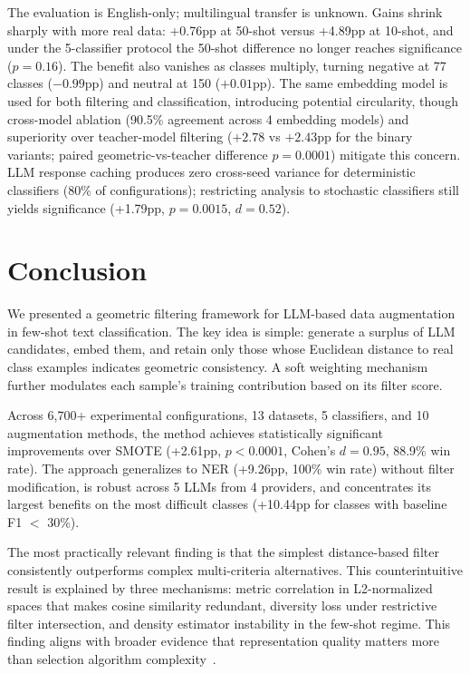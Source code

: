 \documentclass[conference]{IEEEtran}
\begin{document}
The evaluation is English-only; multilingual transfer is unknown. Gains shrink sharply with more real data: +0.76pp at 50-shot versus +4.89pp at 10-shot, and under the 5-classifier protocol the 50-shot difference no longer reaches significance ($p=0.16$). The benefit also vanishes as classes multiply, turning negative at 77 classes ($-0.99$pp) and neutral at 150 ($+0.01$pp). The same embedding model is used for both filtering and classification, introducing potential circularity, though cross-model ablation (90.5\% agreement across 4 embedding models) and superiority over teacher-model filtering ($+2.78$ vs $+2.43$pp for the binary variants; paired geometric-vs-teacher difference $p=0.0001$) mitigate this concern. LLM response caching produces zero cross-seed variance for deterministic classifiers (80\% of configurations); restricting analysis to stochastic classifiers still yields significance (+1.79pp, $p=0.0015$, $d=0.52$).

\section{Conclusion}

We presented a geometric filtering framework for LLM-based data augmentation in few-shot text classification. The key idea is simple: generate a surplus of LLM candidates, embed them, and retain only those whose Euclidean distance to real class examples indicates geometric consistency. A soft weighting mechanism further modulates each sample's training contribution based on its filter score.

Across 6,700+ experimental configurations, 13 datasets, 5 classifiers, and 10 augmentation methods, the method achieves statistically significant improvements over SMOTE (+2.61pp, $p<0.0001$, Cohen's $d=0.95$, 88.9\% win rate). The approach generalizes to NER (+9.26pp, 100\% win rate) without filter modification, is robust across 5 LLMs from 4 providers, and concentrates its largest benefits on the
most difficult classes (+10.44pp for classes with baseline F1 $<$ 30\%).

The most practically relevant finding is that the simplest distance-based filter consistently outperforms complex multi-criteria alternatives. This counterintuitive result is explained by three mechanisms: metric correlation in L2-normalized spaces that makes cosine similarity redundant, diversity loss under restrictive filter intersection, and density estimator instability in the few-shot regime. This finding aligns with broader evidence that representation quality matters more than selection algorithm complexity~\cite{du2025disentangling}.
\end{document}
